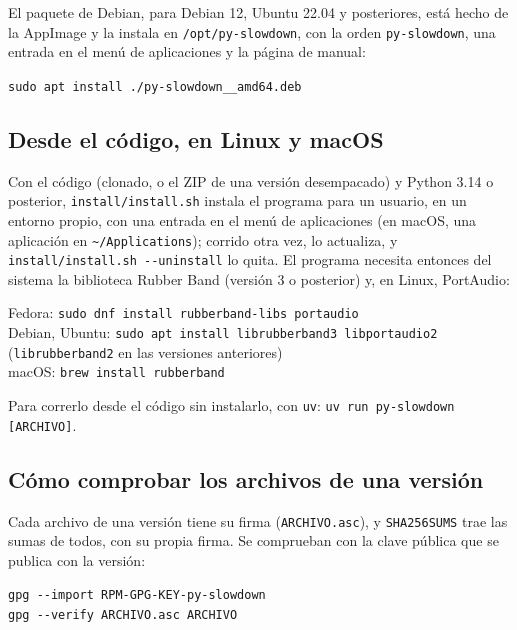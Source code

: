 \documentclass[12pt,
              article,
              oneside
              ]{memoir}
\renewenvironment{quote}%
 {\begin{list}{}%
              {\setlength\rightmargin{0pt}%
              \setlength\leftmargin{\parindent}}%
  \item[]\small\ignorespaces}
 {\unskip\end{list}}
\begin{document}
%
El paquete de Debian, para Debian 12, Ubuntu 22.04 y posteriores, está
hecho de la AppImage y la instala en \texttt{/opt/py-slowdown}, con la
orden \texttt{py-slowdown}, una entrada en el menú de aplicaciones y la
página de manual:

\begin{quote}
\texttt{sudo apt install ./py-slowdown\_\_amd64.deb}
\end{quote}

\subsection{Desde el código, en Linux y macOS}

%
Con el código (clonado, o el ZIP de una versión desempacado) y Python 3.14
o posterior, \texttt{install/install.sh} instala el programa para un
usuario, en un entorno propio, con una entrada en el menú de aplicaciones
(en macOS, una aplicación en \texttt{\textasciitilde/Applications});
corrido otra vez, lo actualiza, y \texttt{install/install.sh -{}-uninstall}
lo quita. El programa necesita entonces del sistema la biblioteca Rubber
Band (versión 3 o posterior) y, en Linux, PortAudio:

\begin{quote}
Fedora: \texttt{sudo dnf install rubberband-libs portaudio}\\
Debian, Ubuntu: \texttt{sudo apt install librubberband3 libportaudio2}\\
(\texttt{librubberband2} en las versiones anteriores)\\
macOS: \texttt{brew install rubberband}
\end{quote}

\noindent{}%
Para correrlo desde el código sin instalarlo, con \texttt{uv}:
\texttt{uv run py-slowdown [ARCHIVO]}.

\subsection{Cómo comprobar los archivos de una versión}
\label{sec:firmas}

%
Cada archivo de una versión tiene su firma (\texttt{ARCHIVO.asc}), y
\texttt{SHA256SUMS} trae las sumas de todos, con su propia firma. Se
comprueban con la clave pública que se publica con la versión:

\begin{quote}
\texttt{gpg -{}-import RPM-GPG-KEY-py-slowdown}\\
\texttt{gpg -{}-verify ARCHIVO.asc ARCHIVO}
\end{quote}
\end{document}
